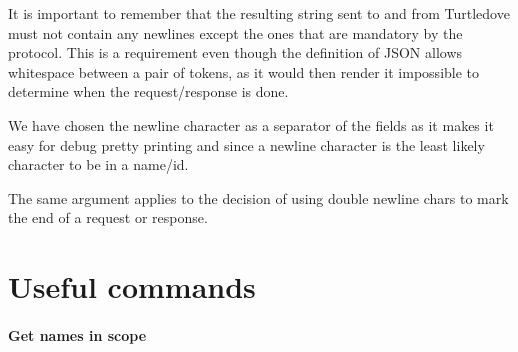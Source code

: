 \documentclass[a4paper, oneside, final]{memoir}
\begin{document}
It is important to remember that the resulting string sent to and from
Turtledove must not contain any newlines except the ones that are mandatory by
the protocol. This is a requirement even though the definition of JSON allows
whitespace between a pair of tokens, as it would then render it impossible to
determine when the request/response is done.

We have chosen the newline character as a separator of the fields as it
makes it easy for debug pretty printing and since a newline character is the least
likely character to be in a name/id.

The same argument applies to the decision of using double newline chars to mark
the end of a request or response. 

\section*{Useful commands}


\paragraph{Get names in scope}
\end{document}
